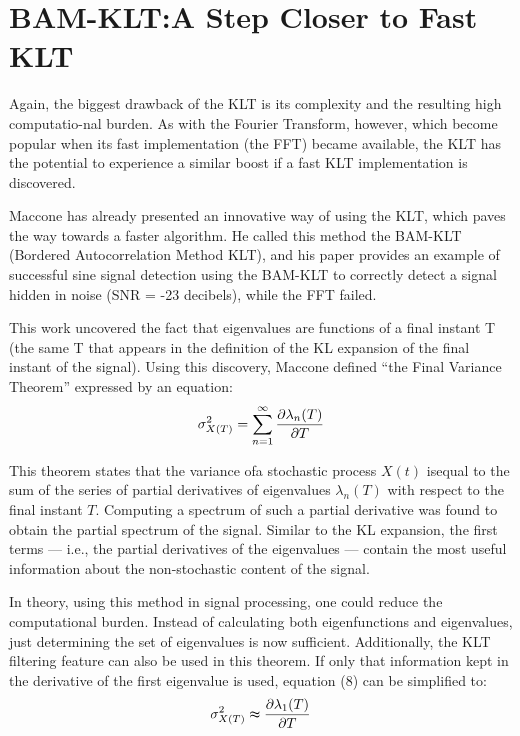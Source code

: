 \documentclass[12pt]{report}
\begin{document}
\section*{BAM-KLT:\@ A Step Closer to Fast KLT}
Again, the biggest drawback of the KLT is its complexity and the resulting high computatio-nal burden. As with the Fourier Transform, however, which become popular when its fast implementation (the FFT) became available, the KLT has the potential to experience a similar boost if a fast KLT implementation is discovered.

Maccone has already presented an innovative way of using the KLT, which paves the way towards a faster algorithm. He called this method the BAM-KLT (Bordered Autocorrelation Method KLT), and his paper provides an example of successful sine signal detection using the BAM-KLT to correctly detect a signal hidden in noise (SNR = -23 decibels), while the FFT failed.

This work uncovered the fact that eigenvalues are functions of a final instant T (the same T that appears in the definition of the KL expansion of the final instant of the signal). Using this discovery, Maccone defined “the Final Variance Theorem” expressed by an equation:
\begin{equation}
	\sigma_{X(T)}^2=\sum_{n=1}^{\infty}\pdv{\lambda_n(T)}{T}
	\label{eq:8}
\end{equation}

This theorem states that the variance ofa stochastic process $X(t)$ isequal to the sum of the series of partial derivatives of eigenvalues $\lambda_n(T)$ with respect to the final instant $T$. Computing a spectrum of such a partial derivative was found to obtain the partial spectrum of the signal. Similar to the KL expansion, the first terms — i.e., the partial derivatives of the eigenvalues — contain the most useful information about the non-stochastic content of the signal.

In theory, using this method in signal processing, one could reduce the computational burden. Instead of calculating both eigenfunctions and eigenvalues, just determining the set of eigenvalues is now sufficient. Additionally, the KLT filtering feature can also be used in this theorem. If only that information kept in the derivative of the first eigenvalue is used, equation (8) can be simplified to:
\begin{equation}
	\sigma_{X(T)}^2 \thickapprox \pdv{\lambda_1(T)}{T}
	\label{eq:9}
\end{equation}
\end{document}
